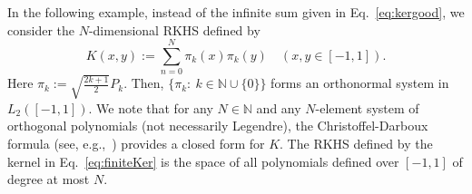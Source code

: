 \documentclass{arxiv}
\begin{document}
In the following example, instead of the infinite sum given in Eq.~\eqref{eq:kergood}, we consider the $N$-dimensional RKHS defined by
\begin{equation}
    \label{eq:finiteKer}
    K(x, y) := \sum_{n=0}^{N} \pi_k(x) \pi_k(y) \quad (x, y \in [-1, 1]).
\end{equation}
Here $\pi_k := \sqrt{\frac{2k + 1}{2}} P_k$. Then, $\{\pi_k: \ k \in \mathbb{N} \cup \{0\}\}$ forms an orthonormal system in $L_2([-1,1])$. We note that for any $N \in \mathbb{N}$ and any $N$-element system of orthogonal polynomials (not necessarily Legendre), the Christoffel-Darboux formula (see, e.g.,~\cite{szego, gautschi, vandenhof}) provides a closed form for $K$. The RKHS defined by the kernel in Eq.~\eqref{eq:finiteKer} is the space of all  polynomials defined over $[-1, 1]$ of degree at most $N$. 
\end{document}
